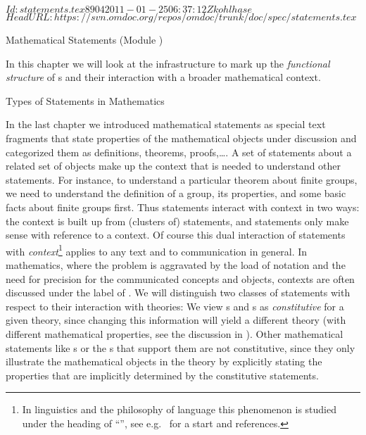 \svnInfo $Id: statements.tex 8904 2011-01-25 06:37:12Z kohlhase $
\svnKeyword $HeadURL: https://svn.omdoc.org/repos/omdoc/trunk/doc/spec/statements.tex $

\begin{omgroup}[short=Mathematical Statements,id=statements]
{Mathematical Statements (Module {})}

  In this chapter we will look at the {\omdoc} infrastructure to mark up the
  {\emph{functional structure}} of {s} and their
  interaction with a broader mathematical context.
  
\begin{omgroup}[id=statements-constitutive]{Types of Statements in Mathematics}
\begin{module}[id=statementtypes]

  In the last chapter we introduced mathematical statements as special text fragments that
  state properties of the mathematical objects under discussion and categorized them as
  definitions, theorems, proofs,\ldots. A set of statements about a related set of objects
  make up the context that is needed to understand other statements.  For instance, to
  understand a particular theorem about finite groups, we need to understand the
  definition of a group, its properties, and some basic facts about finite groups
  first. Thus statements interact with context in two ways: the context is built up from
  (clusters of) statements, and statements only make sense with reference to a context. Of
  course this dual interaction of statements with {\emph{context}}\footnote{In linguistics
    and the philosophy of language this phenomenon is studied under the heading of
    ``{}'', see e.g.~\cite{KamRey:fdtl93}
    for a start and references.}  applies to any text and to communication in general. In
  mathematics, where the problem is aggravated by the load of notation and the need for
  precision for the communicated concepts and objects, contexts are often discussed under
  the label of . We will distinguish
  two classes of statements with respect to their interaction with theories: We view
  {s} and {s} as {\emph{constitutive}} for a given
  theory, since changing this information will yield a different theory (with different
  mathematical properties, see the discussion in {}).  Other
  mathematical statements like {s} or the {s} that
  support them are not constitutive, since they only illustrate the mathematical objects
  in the theory by explicitly stating the properties that are implicitly determined by the
  constitutive statements.
  

\end{module}
\end{omgroup}
\end{omgroup}
